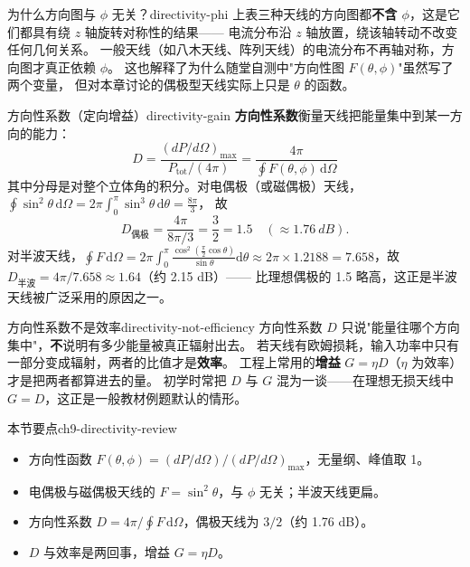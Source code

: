 \documentclass[11pt,a4paper,openany,oneside]{book}
\newcommand{\diff}{\mathrm{d}}
\begin{document}
\begin{insight}{为什么方向图与 $\phi$ 无关？}{directivity-phi}
上表三种天线的方向图都\textbf{不含 $\phi$}，这是它们都具有绕 $z$ 轴旋转对称性的结果——
电流分布沿 $z$ 轴放置，绕该轴转动不改变任何几何关系。
一般天线（如八木天线、阵列天线）的电流分布不再轴对称，方向图才真正依赖 $\phi$。
这也解释了为什么随堂自测中"方向性图 $F(\theta,\phi)$"虽然写了两个变量，
但对本章讨论的偶极型天线实际上只是 $\theta$ 的函数。
\end{insight}

\begin{definition}{方向性系数（定向增益）}{directivity-gain}
\textbf{方向性系数}衡量天线把能量集中到某一方向的能力：
\[
D = \frac{\left(dP/d\Omega\right)_{\max}}{P_{\text{tot}}/(4\pi)}
= \frac{4\pi}{\displaystyle\oint F(\theta,\phi)\,\diff\Omega}
\]
其中分母是对整个立体角的积分。对电偶极（或磁偶极）天线，
$\oint \sin^2\theta\,\diff\Omega = 2\pi\int_0^\pi \sin^3\theta\,\diff\theta = \frac{8\pi}{3}$，
故
\[
D_{\text{偶极}} = \frac{4\pi}{8\pi/3} = \frac{3}{2} = 1.5 \quad(\approx \SI{1.76}{dB}).
\]
对半波天线，$\displaystyle\oint F\,\diff\Omega
= 2\pi\!\int_0^\pi \frac{\cos^2\!\left(\frac{\pi}{2}\cos\theta\right)}{\sin\theta}\diff\theta
\approx 2\pi \times 1.2188 = 7.658$，故
$D_{\text{半波}} = 4\pi/7.658 \approx 1.64$（约 2.15 dB）——
比理想偶极的 1.5 略高，这正是半波天线被广泛采用的原因之一。
\end{definition}

\begin{warning}{方向性系数不是效率}{directivity-not-efficiency}
方向性系数 $D$ 只说"能量往哪个方向集中"，\textbf{不}说明有多少能量被真正辐射出去。
若天线有欧姆损耗，输入功率中只有一部分变成辐射，两者的比值才是\textbf{效率}。
工程上常用的\textbf{增益} $G = \eta D$（$\eta$ 为效率）才是把两者都算进去的量。
初学时常把 $D$ 与 $G$ 混为一谈——在理想无损天线中 $G = D$，这正是一般教材例题默认的情形。
\end{warning}

\begin{review}{本节要点}{ch9-directivity-review}
\begin{itemize}[nosep]
\item 方向性函数 $F(\theta,\phi) = (dP/d\Omega)/(dP/d\Omega)_{\max}$，无量纲、峰值取 1。
\item 电偶极与磁偶极天线的 $F = \sin^2\theta$，与 $\phi$ 无关；半波天线更扁。
\item 方向性系数 $D = 4\pi/\oint F\,\diff\Omega$，偶极天线为 $3/2$（约 1.76 dB）。
\item $D$ 与效率是两回事，增益 $G = \eta D$。
\end{itemize}
\end{review}
\end{document}
